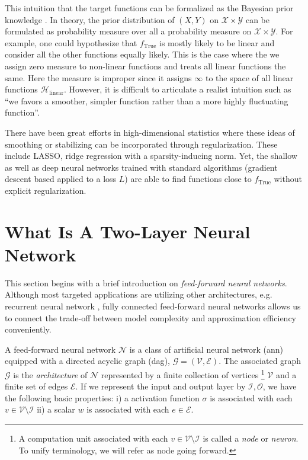 This intuition that the target functions can be formalized as the Bayesian prior
knowledge \TOCITE. In theory, the prior distribution of $(X, Y)$ on $\mathcal{X}
\times \mathcal{Y}$ can be formulated as probability measure over all a
probability measure on $\mathcal{X} \times \mathcal{Y}$.  For example, one could
hypothesize that $f_{\text{True}}$ is mostly likely to be linear and consider
all the other functions equally likely. This is the case where the we assign
zero measure to non-linear functions and treats all linear functions the same.
Here the measure is improper since it assigns $\infty$ to the space of all
linear functions $\mathcal{H}_{\text{linear}}$. However, it is difficult to
articulate a realist intuition such as ``we favors a smoother, simpler function
rather than a more highly fluctuating function''.

There have been great efforts in high-dimensional statistics where these ideas
of smoothing or stabilizing can be incorporated through regularization. These
include LASSO, ridge regression with a sparsity-inducing norm. Yet, the shallow
as well as deep neural networks \TOCITE trained with standard algorithms
(gradient descent based applied to a loss $L$) are able to find functions close
to $f_{\text{True}}$ without explicit regularization. 

\section{What Is A Two-Layer Neural Network}

This section begins with a brief introduction on \textit{feed-forward neural
networks}. Although most targeted applications are utilizing other architectures,
e.g. recurrent neural network \TOCITE, fully connected feed-forward neural
networks allows us to connect the trade-off between model complexity and
approximation efficiency conveniently.

A feed-forward neural network $\mathcal{N}$ is a class of artificial neural
network (\gls{ann}) equipped with a directed acyclic graph (\gls{dag}),
$\mathcal{G} = (\mathcal{V}, \mathcal{E})$. The associated graph $\mathcal{G}$
is the \textit{architecture} of $\mathcal{N}$ represented by a finite collection
of vertices \footnote{
    A computation unit associated with each $v \in \mathcal{V} \setminus \mathcal{I}$
    is called a \textit{node} or \textit{neuron}. To unify terminology, we will 
    refer as node going forward.
}
$\mathcal{V}$ and a finite set of edges $\mathcal{E}$. If we
represent the input and output layer by $\mathcal{I, O}$, we have the following
basic properties: 
i) a activation function $\sigma$ is associated with each 
$v \in \mathcal{V} \setminus \mathcal{I}$ 
ii) a scalar $w$ is associated with each $e \in \mathcal{E}$.

